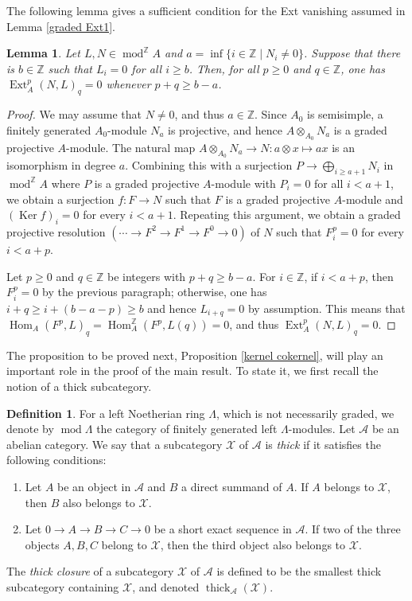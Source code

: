 \documentclass{amsart}
\newtheorem{lem}[thm]{Lemma}
\theoremstyle{definition}
\newtheorem{dfn}[thm]{Definition}
\theoremstyle{remark}
\numberwithin{equation}{thm}
\def\A{\mathcal{A}}
\def\Ext{\operatorname{Ext}}
\def\gHom{\operatorname{Hom}^{\mathbb{Z}}}
\def\gmod{\operatorname{mod}^{\mathbb{Z}}\!}
\def\Hom{\operatorname{Hom}}
\def\ker{\operatorname{Ker}}
\def\L{\Lambda}
\def\ge{\geqslant}
\def\mod{\operatorname{mod}}
\def\thick{\operatorname{thick}}
\def\X{\mathcal{X}}
\def\Z{\mathbb{Z}}
\begin{document}
The following lemma gives a sufficient condition for the Ext vanishing assumed in Lemma \ref{graded Ext1}.

\begin{lem}\label{graded Ext2}
Let $L,N\in\gmod A$ and $a=\inf\{i\in\Z\mid N_i\ne0\}$.
Suppose that there is $b\in\Z$ such that $L_i=0$ for all $i\ge b$.
Then, for all $p\ge0$ and $q\in\Z$, one has $\Ext_A^p(N,L)_q=0$ whenever $p+q\ge b-a$.
\end{lem}

\begin{proof}
We may assume that $N\ne 0$, and thus $a\in\Z$.
Since $A_0$ is semisimple, a finitely generated $A_0$-module $N_a$ is projective, and hence $A\otimes_{A_0}N_a$ is a graded projective $A$-module.
The natural map $A\otimes_{A_0}N_a\to N: a\otimes x\mapsto ax$ is an isomorphism in degree $a$. Combining this with a surjection $P\to \bigoplus_{i\ge a+1}N_i$ in $\gmod A$ where $P$ is a graded projective $A$-module with $P_i=0$ for all $i<a+1$, we obtain a surjection $f: F\to N$ such that $F$ is a graded projective $A$-module and  $(\ker f)_i=0$ for every $i<a+1$. 
Repeating this argument, we obtain a graded projective resolution $(\cdots\to F^2\to F^1\to F^0\to0)$ of $N$ such that $F^p_i=0$ for every $i<a+p$.

Let $p\ge0$ and $q\in\Z$ be integers with $p+q\ge b-a$.
For $i\in\Z$, if $i<a+p$, then $F^p_i=0$ by the previous paragraph; otherwise, one has $i+q\ge i+(b-a-p)\ge b$ and hence $L_{i+q}=0$ by assumption.
This means that $\Hom_A(F^p,L)_q=\gHom_A(F^p,L(q))=0$, and thus $\Ext_A^p(N,L)_q=0$.
\end{proof}

The proposition to be proved next, Proposition \ref{kernel cokernel}, will play an important role in the proof of the main result. To state it, we first recall the notion of a thick subcategory.

\begin{dfn}
For a left Noetherian ring $\L$, which is not necessarily graded, we denote by $\mod\L$ the category of finitely generated left $\L$-modules.
Let $\A$ be an abelian category.
We say that a subcategory $\X$ of $\A$ is {\em thick} if it satisfies the following conditions:
\begin{enumerate}[{\rm (1)}]
\item
Let $A$ be an object in $\A$ and $B$ a direct summand of $A$.
If $A$ belongs to $\X$, then $B$ also belongs to $\X$.
\item
Let $0\to A\to B\to C\to0$ be a short exact sequence in $\A$.
If two of the three objects $A,B,C$ belong to $\X$, then the third object also belongs to $\X$.
\end{enumerate}
The \textit{thick closure} of a subcategory $\X$ of $\A$ is defined to be the smallest thick subcategory containing $\X$, and denoted $\thick_\A (\X)$.
\end{dfn}
\end{document}
